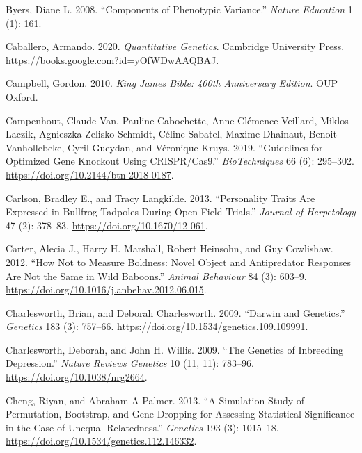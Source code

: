 \documentclass[
]{book}
\newlength{\cslhangindent}
\newlength{\cslentryspacingunit} %
\newenvironment{CSLReferences}[2] %
 {%
  \setlength{\parindent}{0pt}
  \ifodd #1
  \let\oldpar\par
  \def\par{\hangindent=\cslhangindent\oldpar}
  \fi
  \setlength{\parskip}{#2\cslentryspacingunit}
 }%
 {}
\begin{document}
\begin{CSLReferences}{1}{0}
\leavevmode{}%
Byers, Diane L. 2008. {``Components of Phenotypic Variance.''} \emph{Nature Education} 1 (1): 161.

\leavevmode{}%
Caballero, Armando. 2020. \emph{Quantitative {Genetics}}. {Cambridge University Press}. \url{https://books.google.com?id=yOfWDwAAQBAJ}.

\leavevmode{}%
Campbell, Gordon. 2010. \emph{King {James Bible}: 400th {Anniversary Edition}}. {OUP Oxford}.

\leavevmode{}%
Campenhout, Claude Van, Pauline Cabochette, Anne-Clémence Veillard, Miklos Laczik, Agnieszka Zelisko-Schmidt, Céline Sabatel, Maxime Dhainaut, Benoit Vanhollebeke, Cyril Gueydan, and Véronique Kruys. 2019. {``Guidelines for Optimized Gene Knockout Using {CRISPR}/{Cas9}.''} \emph{BioTechniques} 66 (6): 295--302. \url{https://doi.org/10.2144/btn-2018-0187}.

\leavevmode{}%
Carlson, Bradley E., and Tracy Langkilde. 2013. {``Personality {Traits Are Expressed} in {Bullfrog Tadpoles} During {Open-Field Trials}.''} \emph{Journal of Herpetology} 47 (2): 378--83. \url{https://doi.org/10.1670/12-061}.

\leavevmode{}%
Carter, Alecia J., Harry H. Marshall, Robert Heinsohn, and Guy Cowlishaw. 2012. {``How Not to Measure Boldness: Novel Object and Antipredator Responses Are Not the Same in Wild Baboons.''} \emph{Animal Behaviour} 84 (3): 603--9. \url{https://doi.org/10.1016/j.anbehav.2012.06.015}.

\leavevmode{}%
Charlesworth, Brian, and Deborah Charlesworth. 2009. {``Darwin and {Genetics}.''} \emph{Genetics} 183 (3): 757--66. \url{https://doi.org/10.1534/genetics.109.109991}.

\leavevmode{}%
Charlesworth, Deborah, and John H. Willis. 2009. {``The Genetics of Inbreeding Depression.''} \emph{Nature Reviews Genetics} 10 (11, 11): 783--96. \url{https://doi.org/10.1038/nrg2664}.

\leavevmode{}%
Cheng, Riyan, and Abraham A Palmer. 2013. {``A {Simulation Study} of {Permutation}, {Bootstrap}, and {Gene Dropping} for {Assessing Statistical Significance} in the {Case} of {Unequal Relatedness}.''} \emph{Genetics} 193 (3): 1015--18. \url{https://doi.org/10.1534/genetics.112.146332}.


\end{CSLReferences}
\end{document}
